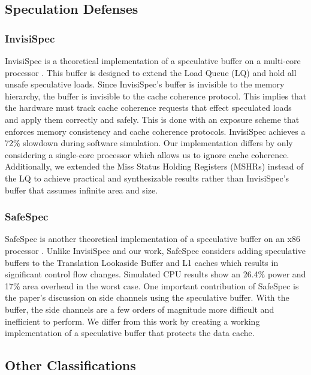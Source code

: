 \subsection{Speculation Defenses}

\subsubsection{InvisiSpec}

InvisiSpec is a theoretical implementation of a speculative buffer on a multi-core
processor \cite{b46}. This buffer is designed to extend the Load Queue (LQ) and hold all unsafe speculative loads.
Since InvisiSpec's buffer is invisible to the memory hierarchy, the buffer is
invisible to the cache coherence protocol. This implies that the hardware must track cache
coherence requests that effect speculated loads and apply them correctly and safely. This is
done with an exposure scheme that enforces memory consistency and cache coherence protocols.
InvisiSpec achieves a 72\% slowdown during software simulation. Our implementation differs by only
considering a single-core processor which allows us to ignore cache coherence. Additionally, we extended the Miss
Status Holding Registers (MSHRs) instead of the LQ to achieve practical and synthesizable results
rather than InvisiSpec's buffer that assumes infinite area and size.

\subsubsection{SafeSpec}

SafeSpec is another theoretical implementation of a speculative buffer on an x86 processor \cite{b29}.
Unlike InvisiSpec and our work, SafeSpec considers adding speculative buffers to the Translation Lookaside Buffer and 
L1 caches which results in significant control flow changes.
Simulated CPU results show an 26.4\% power and 17\% area overhead in the worst case. One
important contribution of SafeSpec is the paper's discussion on side channels using the speculative
buffer. With the buffer, the side channels are a few orders of magnitude more difficult and inefficient to perform.
We differ from this work by creating a working implementation of a speculative buffer that protects the data cache.

\subsection{Other Classifications}

